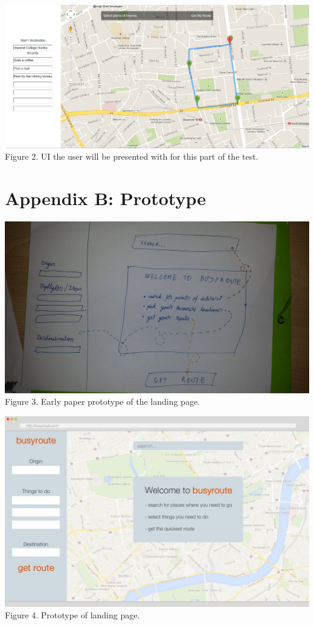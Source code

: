 \documentclass[a4paper, 10pt]{article}
\begin{document}
\begin{center}
\includegraphics[scale=0.4]{hallway_q2.png}\\
Figure 2. UI the user will be presented with for this part of the test.
\end{center}

\newpage
\section*{Appendix B: Prototype}
\begin{center}
\includegraphics[scale=0.25]{proto_1.png}\\
Figure 3. Early paper prototype of the landing page.
\end{center}

\begin{center}
\includegraphics[scale=0.4]{proto_2.png}\\
Figure 4. Prototype of landing page.
\end{center}
\end{document}
